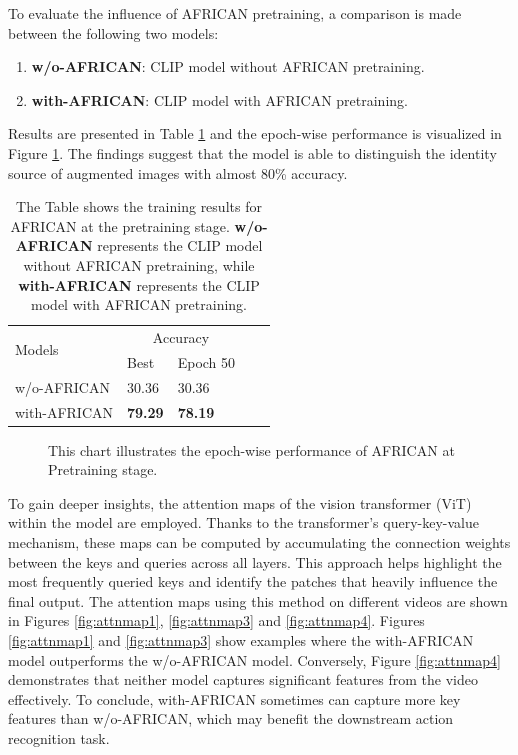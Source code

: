 To evaluate the influence of AFRICAN pretraining, a comparison is made between the following two models: 

\begin{enumerate}
    \item \textbf{w/o-AFRICAN}: CLIP model without AFRICAN pretraining.
    \item \textbf{with-AFRICAN}: CLIP model with AFRICAN pretraining.
\end{enumerate}

Results are presented in Table \ref{tab:africanpretrainingresults} and the epoch-wise performance is visualized in Figure \ref{fig:tp_africanpretraining}. The findings suggest that the model is able to distinguish the identity source of augmented images with almost 80\% accuracy. 

\begin{table}[ht]
    \centering
    \caption[Training Results for AFRICAN at Pretraining stage]{The Table shows the training results for AFRICAN at the pretraining stage. \textbf{w/o-AFRICAN} represents the CLIP model without AFRICAN pretraining, while \textbf{with-AFRICAN} represents the CLIP model with AFRICAN pretraining.
}
    \label{tab:africanpretrainingresults}
    \begin{tabular}{lllll}
        \toprule
        \multirow{2}{*}{Models} & \multicolumn{2}{c}{Accuracy} \\
        \cmidrule{2-3} 
        {} &  Best & Epoch 50\\
        \midrule
        w/o-AFRICAN   & 30.36 & 30.36 \\
        with-AFRICAN  & \textbf{79.29} & \textbf{78.19} \\
        \bottomrule
    \end{tabular}
\end{table}

\begin{figure}[ht]
    \centering
    \resizebox{0.8\textwidth}{!}{}
    \caption[Accuracy of AFRICAN on each Epoch at Pretraining stage]{This chart illustrates the epoch-wise performance of AFRICAN at Pretraining stage.}
    \label{fig:tp_africanpretraining}
\end{figure}

To gain deeper insights, the attention maps of the vision transformer (ViT) within the model are employed. Thanks to the transformer's query-key-value mechanism, these maps can be computed by accumulating the connection weights between the keys and queries across all layers. This approach helps highlight the most frequently queried keys and identify the patches that heavily influence the final output. The attention maps using this method on different videos are shown in Figures \ref{fig:attnmap1}, \ref{fig:attnmap3} and \ref{fig:attnmap4}. Figures \ref{fig:attnmap1} and \ref{fig:attnmap3} show examples where the with-AFRICAN model outperforms the w/o-AFRICAN model. Conversely, Figure \ref{fig:attnmap4} demonstrates that neither model captures significant features from the video effectively. To conclude,  with-AFRICAN sometimes can capture more key features than w/o-AFRICAN, which may benefit the downstream action recognition task.

